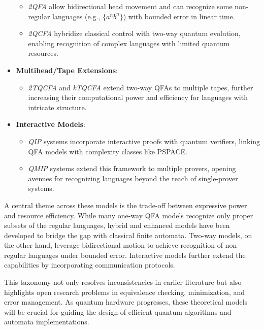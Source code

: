 \begin{itemize}
    \begin{itemize}
        \item \textit{2QFA} allow bidirectional head movement and can recognize some non-regular languages (e.g., \( \{a^n b^n\} \)) with bounded error in linear time.
        \item \textit{2QCFA} hybridize classical control with two-way quantum evolution, enabling recognition of complex languages with limited quantum resources.
    \end{itemize}
    \item \textbf{Multihead/Tape Extensions}:  
    \begin{itemize}
        \item \textit{2TQCFA} and \textit{kTQCFA} extend two-way QFAs to multiple tapes, further increasing their computational power and efficiency for languages with intricate structure.
    \end{itemize}
    \item \textbf{Interactive Models}:  
    \begin{itemize}
        \item \textit{QIP} systems incorporate interactive proofs with quantum verifiers, linking QFA models with complexity classes like PSPACE.
        \item \textit{QMIP} systems extend this framework to multiple provers, opening avenues for recognizing languages beyond the reach of single-prover systems.
    \end{itemize}
\end{itemize}

A central theme across these models is the trade-off between expressive power and resource efficiency. While many one-way QFA models recognize only proper subsets of the regular languages, hybrid and enhanced models have been developed to bridge the gap with classical finite automata. Two-way models, on the other hand, leverage bidirectional motion to achieve recognition of non-regular languages under bounded error. Interactive models further extend the capabilities by incorporating communication protocols.

This taxonomy not only resolves inconsistencies in earlier literature but also highlights open research problems in equivalence checking, minimization, and error management. As quantum hardware progresses, these theoretical models will be crucial for guiding the design of efficient quantum algorithms and automata implementations.
